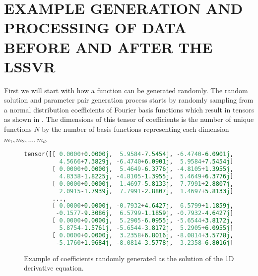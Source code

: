 \clearpage
\appendix

\chapter{EXAMPLE GENERATION AND PROCESSING OF DATA BEFORE AND AFTER THE LSSVR}\label{ch:example_prepostprocessing_basis}
First we will start with how a function can be generated randomly. The random solution and parameter pair generation process starts by randomly sampling from a normal distribution coefficients of Fourier basis functions which result in tensors as shown in . The dimensions of this tensor of coefficients is the number of unique functions \(N\) by the number of basis functions representing each dimension \(m_1, m_2, \ldots, m_d\).
\begin{figure}[H]
  \centering
  \begin{lstlisting}[language=Python]
tensor([[ 0.0000+0.0000j,  5.9584-7.5454j, -6.4740-6.0901j,  ...,
          4.5666+7.3829j, -6.4740+6.0901j,  5.9584+7.5454j],
        [ 0.0000+0.0000j,  5.4649-6.3776j, -4.8105+1.3955j,  ...,
          4.8338-1.8225j, -4.8105-1.3955j,  5.4649+6.3776j],
        [ 0.0000+0.0000j,  1.4697-5.8133j,  7.7991+2.8807j,  ...,
          2.0915-1.7939j,  7.7991-2.8807j,  1.4697+5.8133j],
        ...,
        [ 0.0000+0.0000j, -0.7932+4.6427j,  6.5799+1.1859j,  ...,
         -0.1577-9.3086j,  6.5799-1.1859j, -0.7932-4.6427j],
        [ 0.0000+0.0000j,  5.2905-6.0955j, -5.6544+3.8172j,  ...,
          5.8754-1.5761j, -5.6544-3.8172j,  5.2905+6.0955j],
        [ 0.0000+0.0000j,  3.2358+6.8016j, -8.0814+3.5778j,  ...,
         -5.1760+1.9684j, -8.0814-3.5778j,  3.2358-6.8016j]])
\end{lstlisting}
  \caption{Example of coefficients randomly generated as the solution of the 1D derivative equation.}\label{fig:example_generated_coefficients}
\end{figure}

